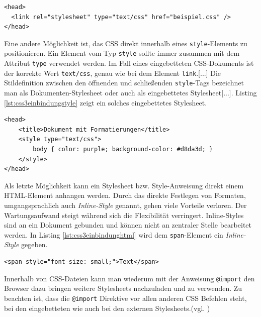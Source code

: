 \vspace{1em}
\begin{lstlisting}[language=HTML5, caption=Stylesheet Einbindung über \texttt{link}-Element, label=lst:css3einbindunglink]
<head>
  <link rel="stylesheet" type="text/css" href="beispiel.css" />
</head>
\end{lstlisting}

Eine andere Möglichkeit ist, das CSS direkt innerhalb eines \texttt{style}-Elements zu positionieren. Ein Element vom Typ \glqq \texttt{style} sollte immer zusammen mit dem Attribut \texttt{type} verwendet werden. Im Fall eines eingebetteten CSS-Dokuments ist der korrekte Wert \texttt{text/css}, genau wie bei dem Element \texttt{link}.[...] Die Stildefinition zwischen den öffnenden und schließenden \texttt{style}-Tags bezeichnet man als Dokumenten-Stylesheet oder auch als eingebettetes Stylesheet[...].\grqq{}\cite[S.19]{MeyeCasc2005} Listing \ref{lst:css3einbindungstyle} zeigt ein solches eingebettetes Stylesheet.

\vspace{1em}
\begin{lstlisting}[language=HTML5, caption=Stylesheet Einbindung über \texttt{style}-Element, label=lst:css3einbindungstyle]
<head>
	<title>Dokument mit Formatierungen</title>
	<style type="text/css">
		body { color: purple; background-color: #d8da3d; }
	</style>
</head>
\end{lstlisting}
	
Als letzte Möglichkeit kann ein Stylesheet bzw. Style-Anweisung direkt einem HTML-Element anhangen werden. \glqq Durch das direkte Festlegen von Formaten, umgangsprachlich auch \textit{Inline-Style} genannt, gehen viele Vorteile verloren. Der Wartungsaufwand steigt während sich die Flexibilität verringert. Inline-Styles sind an ein Dokument gebunden und können nicht an zentraler Stelle bearbeitet werden.\grqq{}\cite{SelfHtml20144} In Listing \ref{lst:css3einbindunghtml} wird dem \texttt{span}-Element ein \textit{Inline-Style} gegeben.

\vspace{1em}
\begin{lstlisting}[language=HTML5, caption=Stylesheet Einbindung in \texttt{html}-Element, label=lst:css3einbindunghtml]
<span style="font-size: small;">Text</span>
\end{lstlisting}
	
Innerhalb von CSS-Dateien kann man wiederum mit der Anweisung \texttt{@import} den Browser dazu bringen weitere Stylesheets nachzuladen und zu verwenden. Zu beachten ist, dass die \texttt{@import} Direktive vor allen anderen CSS Befehlen steht, bei den eingebetteten wie auch bei den externen Stylesheets.(vgl. \cite[S.20]{MeyeCasc2005})


